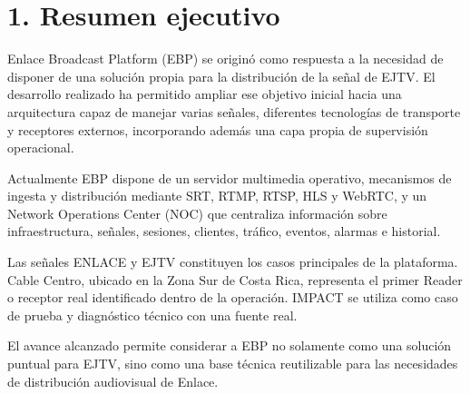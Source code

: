 \section{1. Resumen ejecutivo}

Enlace Broadcast Platform (EBP) se originó como respuesta a la necesidad de disponer de una solución propia para la distribución de la señal de EJTV. El desarrollo realizado ha permitido ampliar ese objetivo inicial hacia una arquitectura capaz de manejar varias señales, diferentes tecnologías de transporte y receptores externos, incorporando además una capa propia de supervisión operacional.

Actualmente EBP dispone de un servidor multimedia operativo, mecanismos de ingesta y distribución mediante SRT, RTMP, RTSP, HLS y WebRTC, y un Network Operations Center (NOC) que centraliza información sobre infraestructura, señales, sesiones, clientes, tráfico, eventos, alarmas e historial.

Las señales ENLACE y EJTV constituyen los casos principales de la plataforma. Cable Centro, ubicado en la Zona Sur de Costa Rica, representa el primer Reader o receptor real identificado dentro de la operación. IMPACT se utiliza como caso de prueba y diagnóstico técnico con una fuente real.

\begin{callout}
El avance alcanzado permite considerar a EBP no solamente como una solución puntual para EJTV, sino como una base técnica reutilizable para las necesidades de distribución audiovisual de Enlace.
\end{callout}
